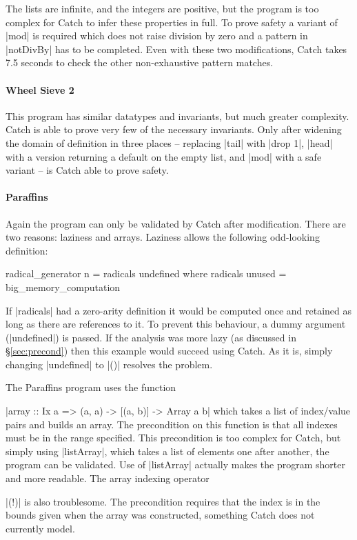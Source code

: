 \documentclass[preprint]{sigplanconf}
\begin{document}
The lists are infinite, and the integers are positive, but the program is too complex for Catch to infer these properties in full. To prove safety a variant of |mod| is required which does not raise division by zero and a pattern in |notDivBy| has to be completed. Even with these two modifications, Catch takes 7.5 seconds to check the other non-exhaustive pattern matches.


\paragraph{Wheel Sieve 2}

This program has similar datatypes and invariants, but much greater complexity. Catch is able to prove very few of the necessary invariants. Only after widening the domain of definition in three places -- replacing |tail| with |drop 1|, |head| with a version returning a default on the empty list, and |mod| with a safe variant -- is Catch able to prove safety.


\paragraph{Paraffins}

Again the program can only be validated by Catch after modification. There are two reasons: laziness and arrays. Laziness allows the following odd-looking definition:

\begin{comment}
\begin{code}
big_memory_computation = undefined
\end{code}
\end{comment}

\begin{code}
radical_generator n = radicals undefined
  where radicals unused = big_memory_computation
\end{code}

If |radicals| had a zero-arity definition it would be computed once and retained as long as there are references to it. To prevent this behaviour, a dummy argument (|undefined|) is passed. If the analysis was more lazy (as discussed in \S\ref{sec:precond}) then this example would succeed using Catch. As it is, simply changing |undefined| to |()| resolves the problem.

The Paraffins program uses the function \ignore|array :: Ix a => (a, a) -> [(a, b)] -> Array a b| which takes a list of index/value pairs and builds an array. The precondition on this function is that all indexes must be in the range specified. This precondition is too complex for Catch, but simply using |listArray|, which takes a list of elements one after another, the program can be validated. Use of |listArray| actually makes the program shorter and more readable. The array indexing operator \ignore|(!)| is also troublesome. The precondition requires that the index is in the bounds given when the array was constructed, something Catch does not currently model.
\end{document}
